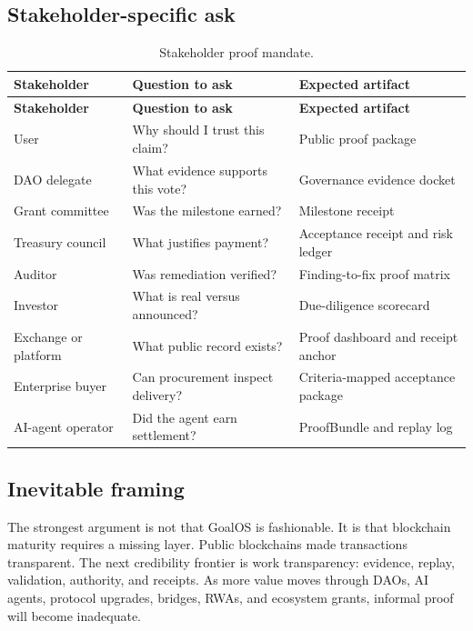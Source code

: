 \subsection{Stakeholder-specific ask}

\begin{longtable}{p{} p{} p{}}
\caption{Stakeholder proof mandate.}\label{tab:stakeholders}\\
\toprule
\textbf{Stakeholder} & \textbf{Question to ask} & \textbf{Expected artifact}\\
\midrule
\endfirsthead
\toprule
\textbf{Stakeholder} & \textbf{Question to ask} & \textbf{Expected artifact}\\
\midrule
\endhead
User & Why should I trust this claim? & Public proof package \\
DAO delegate & What evidence supports this vote? & Governance evidence docket \\
Grant committee & Was the milestone earned? & Milestone receipt \\
Treasury council & What justifies payment? & Acceptance receipt and risk ledger \\
Auditor & Was remediation verified? & Finding-to-fix proof matrix \\
Investor & What is real versus announced? & Due-diligence scorecard \\
Exchange or platform & What public record exists? & Proof dashboard and receipt anchor \\
Enterprise buyer & Can procurement inspect delivery? & Criteria-mapped acceptance package \\
AI-agent operator & Did the agent earn settlement? & ProofBundle and replay log \\
\bottomrule
\end{longtable}

\subsection{Inevitable framing}

The strongest argument is not that GoalOS is fashionable. It is that blockchain maturity requires a missing layer. Public blockchains made transactions transparent. The next credibility frontier is work transparency: evidence, replay, validation, authority, and receipts. As more value moves through DAOs, AI agents, protocol upgrades, bridges, RWAs, and ecosystem grants, informal proof will become inadequate.


